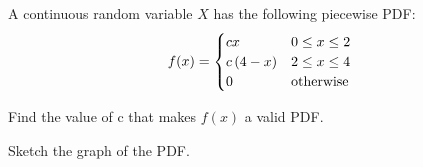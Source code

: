 \documentclass[a4paper, 10pt]{article}
\begin{document}
\newpage

\begin{problem}
A continuous random variable \( X \) has the following piecewise PDF:
\[
f(x) = \begin{cases}
cx & 0 \leq x \le 2 \\
c\left(4 - x\right) & 2 \leq x \leq 4 \\
0 & \text{otherwise}
\end{cases}
\]
\begin{subproblems}
    \item Find the value of c that makes \( f(x) \) a valid PDF.
    \item Sketch the graph of the PDF.
\end{subproblems}
\end{problem}
\end{document}
